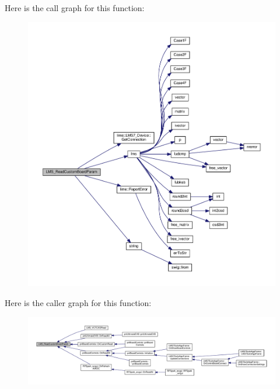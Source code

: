 Here is the call graph for this function\+:
\nopagebreak
\begin{figure}[H]
\begin{center}
\leavevmode
\includegraphics[width=350pt]{df/de1/lms7__api_8cpp_af7e9535a812f022b6c566144e2fea45a_cgraph}
\end{center}
\end{figure}




Here is the caller graph for this function\+:
\nopagebreak
\begin{figure}[H]
\begin{center}
\leavevmode
\includegraphics[width=350pt]{df/de1/lms7__api_8cpp_af7e9535a812f022b6c566144e2fea45a_icgraph}
\end{center}
\end{figure}


